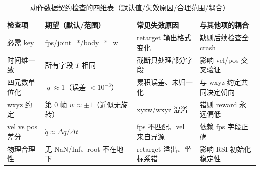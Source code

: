 \begin{table}[ht]
\centering
\small
\caption{动作数据契约检查的四维表（默认值/失效原因/合理范围/耦合）}
\label{tab:rlmc-imit-contract}
\begin{tabular}{@{}llll@{}}
\toprule
检查项 & 期望（默认/范围） & 常见失效原因 & 与其他项的耦合 \\
\midrule
必需 key & fps/joint\_*/body\_*\_w & retarget 输出格式变化 & 缺则后续检查全 crash \\
时间维一致 & 所有字段 $T$ 相同 & 截断只处理部分字段 & 影响 vel/pos 交叉验证 \\
四元数单位化 & $\lvert q\rvert\approx 1$（误差 $<10^{-3}$） & 累积误差、未归一化 & 与 wxyz 约定共同决定朝向 \\
wxyz 约定 & 第 0 帧 $w\approx\pm1$（近似无旋转） & xyzw/wxyz 混淆 & 错则 reward 永远偏低 \\
vel vs pos 差分 & $\dot q\approx\Delta q/\Delta t$ & fps 不匹配、vel 来自异源 & 依赖 fps 字段正确 \\
物理合理性 & 无 NaN/Inf、root 不在地下 & retarget 溢出、坐标系错 & 影响 RSI 初始化稳定性 \\
\bottomrule
\end{tabular}
\end{table}

